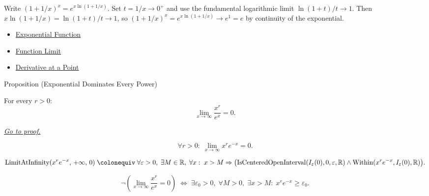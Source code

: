 \begin{remark*}[Interpretation]
Write $(1+1/x)^x = e^{x\ln(1+1/x)}$. Set $t = 1/x \to 0^+$ and use
the fundamental logarithmic limit $\ln(1+t)/t \to 1$. Then
$x\ln(1+1/x) = \ln(1+t)/t \to 1$, so $(1+1/x)^x = e^{x\ln(1+1/x)}
\to e^1 = e$ by continuity of the exponential.
\end{remark*}

\begin{dependencies}
\begin{itemize}
  \item \hyperref[def:exponential]{Exponential Function}
  \item \hyperref[def:limit-function]{Function Limit}
  \item \hyperref[def:derivative-at-a-point]{Derivative at a Point}
\end{itemize}
\end{dependencies}


\begin{propositionbox}{Proposition (Exponential Dominates Every Power)}
\begin{proposition}
\label{prop:exponential-dominates-power}
For every $r > 0$:
\[
  \lim_{x \to \infty} \frac{x^r}{e^x} = 0.
\]

\smallskip\noindent


\hyperref[prf:exponential-dominates-power]{\textit{Go to proof.}}
\end{proposition}
\end{propositionbox}

\begin{remark*}
\[
  \forall r > 0 :\; \lim_{x \to \infty} x^r e^{-x} = 0.
\]
\end{remark*}

\begin{remark*}
\[
  \operatorname{LimitAtInfinity}(x^r e^{-x},\,+\infty,\,0)
  \;\colonequiv\;
  \forall\varepsilon>0,\;\exists M\in\mathbb{R},\;\forall x:\;
  x>M \Rightarrow
  \bigl(
    \operatorname{IsCenteredOpenInterval}(I_\varepsilon(0),0,\varepsilon,\mathbb R)
    \wedge
    \operatorname{Within}(x^r e^{-x},I_\varepsilon(0),\mathbb R)
  \bigr).
\]
\end{remark*}

\begin{remark*}
\[
  \neg\left(\lim_{x\to\infty}\frac{x^r}{e^x}=0\right)
  \;\iff\;
  \exists\varepsilon_0>0,\;\forall M>0,\;\exists x>M:\;
  x^r e^{-x} \geq \varepsilon_0.
\]
\end{remark*}

